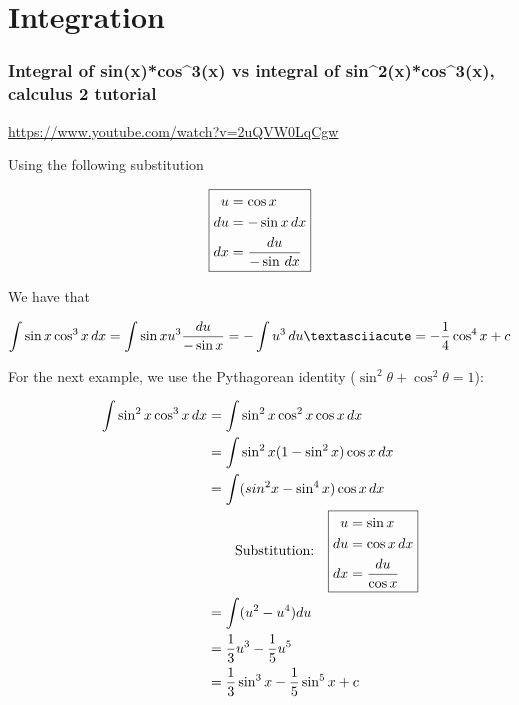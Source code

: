 \chapter{Integration}
\subsection{Integral of sin(x)*cos^{}3(x) vs integral of sin^{}2(x)*cos^{}3(x), calculus 2 tutorial}
\url{https://www.youtube.com/watch?v=2uQVW0LqCgw}

Using the following substitution

\begin{equation}
  \boxed{
    \begin{aligned}
      u &= \cos x \\
      du &= -\sin x \, dx \\
      dx &= \frac{du}{-\sin \, dx}
    \end{aligned}
  }
\end{equation}

We have that

\begin{equation}
\int \sin x \cos^3 x \dx = \int \sin x u^3 \frac{du}{-\sin x}=-\int u^3 \du´= - \frac{1}{4} \cos^4 x + c
\end{equation}

For the next example, we use the Pythagorean identity ($\sin^2 \theta + \cos^2 \theta = 1$):

\begin{equation}
  \begin{aligned}
    \int \sin^2 x \cos^3 x \, dx
    &= \int \sin^2 x \cos^2 x \cos x \, dx \\
    &= \int \sin^2 x (1-\sin^2x) \cos x \, dx \\
    &= \int (sin^2 x - \sin^4 x) \cos x \, dx \\
    & \qquad
    \text{Substitution:}
    \quad
    \boxed{
      \begin{aligned}
        u &= \sin x \\
        du &= \cos x \, dx \\
        dx &= \frac{du}{\cos x}
      \end{aligned}
    } \\
    &= \int (u^2 - u^4) du \\
    &= \frac{1}{3}u^3 - \frac{1}{5}u^5 \\
    &= \frac{1}{3}\sin^3 x - \frac{1}{5}\sin^5 x + c
  \end{aligned}
\end{equation}

